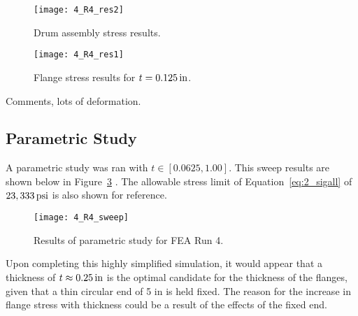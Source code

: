\begin{figure}[H]
	\centering
	\texttt{[image: 4\_R4\_res2]}
	\caption{Drum assembly stress results.}
	\label{fig:4_R4_res2}
\end{figure}
\begin{figure}[H]
	\centering
	\texttt{[image: 4\_R4\_res1]}
	\caption{Flange stress results for $t=0.125 \,\mathrm{in}$.}
	\label{fig:4_R4_res1}
\end{figure}

Comments, lots of deformation.\\

\subsection{Parametric Study}

A parametric study was ran with $t \in [0.0625, 1.00]$. This sweep results are shown below in Figure~\ref{fig:4_R4_sweep} \cite{EXCEL}. The allowable stress limit of Equation~\ref{eq:2_sigall} of $23,333 \,\mathrm{psi}$ is also shown for reference.

\begin{figure}[H]
	\centering
	\texttt{[image: 4\_R4\_sweep]}
	\caption{Results of parametric study for FEA Run 4.}
	\label{fig:4_R4_sweep}
\end{figure}

Upon completing this highly simplified simulation, it would appear that a thickness of $t\approx 0.25 \,\mathrm{in}$ is the optimal candidate for the thickness of the flanges, given that a thin circular end of 5 in is held fixed. The reason for the increase in flange stress with thickness could be a result of the effects of the fixed end.

